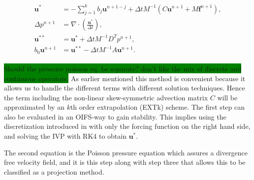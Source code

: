 \begin{align}
    \begin{split}
        \mathbf{u}^{*} &= -\sum_{j=1}^kb_{j}\mathbf{u}^{n+1-j}
        +\Delta t M^{-1} (C\mathbf{u}^{n+1}+M\mathbf{f}^{n+1}),\\
        \Delta p^{n+1} &= \nabla \cdot \left(  \frac{\mathbf{u}^{*}}{\Delta t}\right),\\
        \mathbf{u}^{**} &= \mathbf{u}^{*} + \Delta t M^{-1}D^T p^{n+1},\\
        b_0\mathbf{u}^{n+1} &= \mathbf{u}^{**} -\Delta t M^{-1} A\mathbf{u}^{n+1}.
    \end{split}
    \label{eq:fracstep}
\end{align}

\colorbox{green}{Should the pressure poisson eq. be separate? don't like the mix of discrete and continuous operators.} 
As earlier mentioned this method is convenient because it allows us to handle the different 
terms with different solution techniques. Hence the term including the
non-linear skew-symmetric advection matrix $C$ will be approximated by
an $k$th order extrapolation (EXTk) scheme. The first step can also be evaluated in 
an OIFS-way to gain stability. This implies using the discretization introduced in 
with only the forcing function on the right hand side, and solving the
IVP  with RK4 to obtain $\mathbf{u}^{*}$. 

The second equation is the Poisson pressure equation which
assures a divergence free velocity field, and it is this step along with step three that 
allows this to be classified as a projection method.

